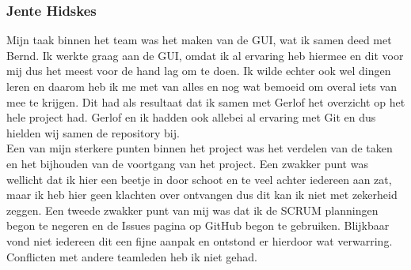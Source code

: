 \documentclass[a4paper,11pt,titlepage]{scrartcl}
\begin{document}
\subsubsection{Jente Hidskes}
Mijn taak binnen het team was het maken van de GUI, wat ik samen deed met Bernd. Ik werkte graag aan de GUI, omdat ik al ervaring heb hiermee en dit voor mij dus het meest voor de hand lag om te doen. Ik wilde echter ook wel dingen leren en daarom heb ik me met van alles en nog wat bemoeid om overal iets van mee te krijgen. Dit had als resultaat dat ik samen met Gerlof het overzicht op het hele project had. Gerlof en ik hadden ook allebei al ervaring met Git en dus hielden wij samen de repository bij.\\
Een van mijn sterkere punten binnen het project was het verdelen van de taken en het bijhouden van de voortgang van het project. Een zwakker punt was wellicht dat ik hier een beetje in door schoot en te veel achter iedereen aan zat, maar ik heb hier geen klachten over ontvangen dus dit kan ik niet met zekerheid zeggen. Een tweede zwakker punt van mij was dat ik de SCRUM planningen begon te negeren en de Issues pagina op GitHub begon te gebruiken. Blijkbaar vond niet iedereen dit een fijne aanpak en ontstond er hierdoor wat verwarring. Conflicten met andere teamleden heb ik niet gehad.
\end{document}
